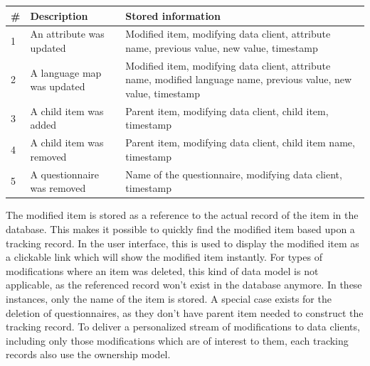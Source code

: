 \documentclass[a4paper,11pt]{article}
\begin{document}
                \begin{table}[H]
                    \begin{tabularx}{\textwidth}{|l|l|X|}
                        \hline
                        \# & Description & Stored information \\
                        \hline \hline
                        1 & An attribute was updated  & Modified item, modifying data client, attribute name, previous value, new value, timestamp \\
                        2 & A language map was updated & Modified item, modifying data client, attribute name, modified language name, previous value, new value, timestamp \\
                        \hline
                        3 & A child item was added & Parent item, modifying data client, child item, timestamp \\
                        4 & A child item was removed & Parent item, modifying data client, child item name, timestamp \\
                        \hline
                        5 & A questionnaire was removed & Name of the questionnaire, modifying data client, timestamp\\
                        \hline
                    \end{tabularx}
                \end{table}

                The modified item is stored as a reference to the actual record of the item in the database.
                This makes it possible to quickly find the modified item based upon
                a tracking record. In the user interface, this is used to display the
                modified item as a clickable link which will show the modified item
                instantly. For types of modifications where an item was deleted, this 
                kind of data model is not applicable, as the referenced record won't 
                exist in the database anymore. In these instances, only the name of
                the item is stored. A special case exists for the deletion of questionnaires,
                as they don't have parent item needed to construct the tracking record.
                To deliver a personalized stream of modifications to data clients,
                including only those modifications which are of interest to them,
                each tracking records also use the ownership model.
\end{document}
